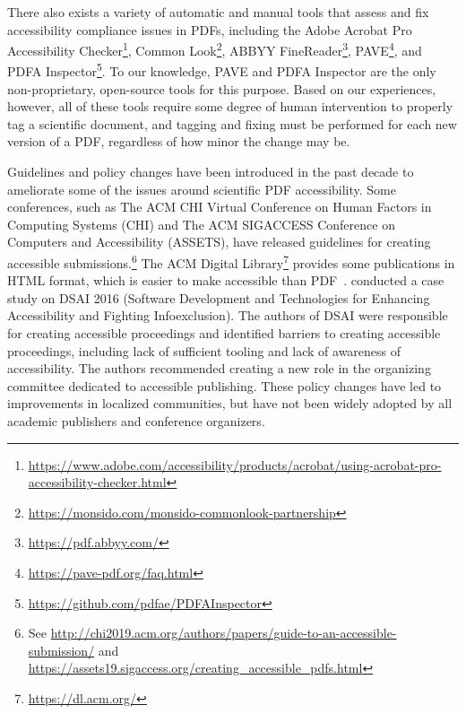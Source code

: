 There also exists a variety of automatic and manual tools that assess and fix accessibility compliance issues in PDFs, including the Adobe Acrobat Pro Accessibility Checker\footnote{\href{https://www.adobe.com/accessibility/products/acrobat/using-acrobat-pro-accessibility-checker.html}{https://www.adobe.com/accessibility/products/acrobat/using-acrobat-pro-accessibility-checker.html}}, Common Look\footnote{\href{https://monsido.com/monsido-commonlook-partnership}{https://monsido.com/monsido-commonlook-partnership}}, ABBYY FineReader\footnote{\href{https://pdf.abbyy.com/}{https://pdf.abbyy.com/}}, PAVE\footnote{\href{https://pave-pdf.org/faq.html}{https://pave-pdf.org/faq.html}}, and PDFA Inspector\footnote{\href{https://github.com/pdfae/PDFAInspector}{https://github.com/pdfae/PDFAInspector}}. To our knowledge, PAVE and PDFA Inspector are the only non-proprietary, open-source tools for this purpose. Based on our experiences, however, all of these tools require some degree of human intervention to properly tag a scientific document, and tagging and fixing must be performed for each new version of a PDF, regardless of how minor the change may be.

Guidelines and policy changes have been introduced in the past decade to ameliorate some of the issues around scientific PDF accessibility. Some conferences, such as The ACM CHI Virtual Conference on Human Factors in Computing Systems (CHI) and The ACM SIGACCESS Conference on Computers and Accessibility (ASSETS), have released guidelines for creating accessible submissions.\footnote{See \href{http://chi2019.acm.org/authors/papers/guide-to-an-accessible-submission/}{http://chi2019.acm.org/authors/papers/guide-to-an-accessible-submission/} and \href{https://assets19.sigaccess.org/creating_accessible_pdfs.html}{https://assets19.sigaccess.org/creating\_accessible\_pdfs.html}} The ACM Digital Library\footnote{\href{https://dl.acm.org/}{https://dl.acm.org/}} provides some publications in HTML format, which is easier to make accessible than PDF~\cite{Graells2007EstudioDL}. \citet{Ribera2019PublishingAP} conducted a case study on DSAI 2016 (Software Development and Technologies for Enhancing Accessibility and Fighting Infoexclusion). The authors of DSAI were responsible for creating accessible proceedings and identified barriers to creating accessible proceedings, including lack of sufficient tooling and lack of awareness of accessibility. The authors recommended creating a new role in the organizing committee dedicated to accessible publishing. These policy changes have led to improvements in localized communities, but have not been widely adopted by all academic publishers and conference organizers.

